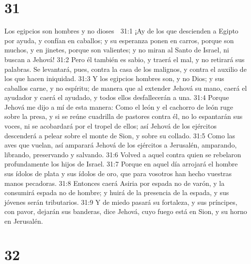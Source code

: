\chapter{31}

Los egipcios son hombres y no dioses  

31:1 ¡Ay de los que descienden a Egipto por ayuda, y confían en caballos; y su esperanza ponen en carros, porque son muchos, y en jinetes, porque son valientes; y no miran al Santo de Israel, ni buscan a Jehová!  
31:2 Pero él también es sabio, y traerá el mal, y no retirará sus palabras. Se levantará, pues, contra la casa de los malignos, y contra el auxilio de los que hacen iniquidad.  
31:3 Y los egipcios hombres son, y no Dios; y sus caballos carne, y no espíritu; de manera que al extender Jehová su mano, caerá el ayudador y caerá el ayudado, y todos ellos desfallecerán a una.  
31:4 Porque Jehová me dijo a mí de esta manera: Como el león y el cachorro de león ruge sobre la presa, y si se reúne cuadrilla de pastores contra él, no lo espantarán sus voces, ni se acobardará por el tropel de ellos; así Jehová de los ejércitos descenderá a pelear sobre el monte de Sion, y sobre su collado.  
31:5 Como las aves que vuelan, así amparará Jehová de los ejércitos a Jerusalén, amparando, librando, preservando y salvando.  
31:6 Volved a aquel contra quien se rebelaron profundamente los hijos de Israel.  
31:7 Porque en aquel día arrojará el hombre sus ídolos de plata y sus ídolos de oro, que para vosotros han hecho vuestras manos pecadoras. 
31:8 Entonces caerá Asiria por espada no de varón, y la consumirá espada no de hombre; y huirá de la presencia de la espada, y sus jóvenes serán tributarios.  
31:9 Y de miedo pasará su fortaleza, y sus príncipes, con pavor, dejarán sus banderas, dice Jehová, cuyo fuego está en Sion, y su horno en Jerusalén.  

\chapter{32}


